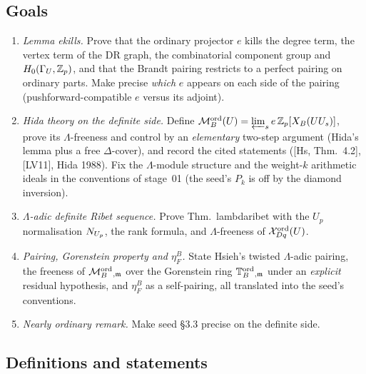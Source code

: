 \subsection{Goals}
\begin{enumerate}[label=(G\arabic*)]
\item \emph{Lemma ekills.} Prove that the ordinary projector $e$ kills the degree term, the vertex term of the DR graph, the
  combinatorial component group and $H_0(\Gamma_U,\mathbb{Z}_p)$, and that the Brandt pairing restricts to a perfect pairing on ordinary
  parts. Make precise \emph{which} $e$ appears on each side of the pairing (pushforward-compatible $e$ versus its adjoint).
\item \emph{Hida theory on the definite side.} Define $\mathcal{M}^{\mathrm{ord}}_B(U)=\varprojlim_se\,\mathbb{Z}_p[X_B(UU_s)]$, prove its $\Lambda$-freeness and
  control by an \emph{elementary} two-step argument (Hida's lemma plus a free $\Delta$-cover), and record the cited statements
  ([Hs, Thm.~4.2], [LV11], Hida 1988). Fix the $\Lambda$-module structure and the weight-$k$ arithmetic ideals in the
  conventions of stage~01 (the seed's $P_k$ is off by the diamond inversion).
\item \emph{$\Lambda$-adic definite Ribet sequence.} Prove Thm.~lambdaribet with the $U_p$ normalisation $N_{U_p}$, the rank formula,
  and $\Lambda$-freeness of $\mathcal{X}^{\mathrm{ord}}_{Dq}(U)$.
\item \emph{Pairing, Gorenstein property and $\eta^B_F$.} State Hsieh's twisted $\Lambda$-adic pairing, the freeness of
  $\mathcal{M}^{\mathrm{ord}}_B{}_{,\mathfrak{m}}$ over the Gorenstein ring $\mathbb{T}^{\mathrm{ord}}_B{}_{,\mathfrak{m}}$ under an \emph{explicit} residual hypothesis, and $\eta^B_F$ as a
  self-pairing, all translated into the seed's conventions.
\item \emph{Nearly ordinary remark.} Make seed \S3.3 precise on the definite side.
\end{enumerate}

\subsection{Definitions and statements}

